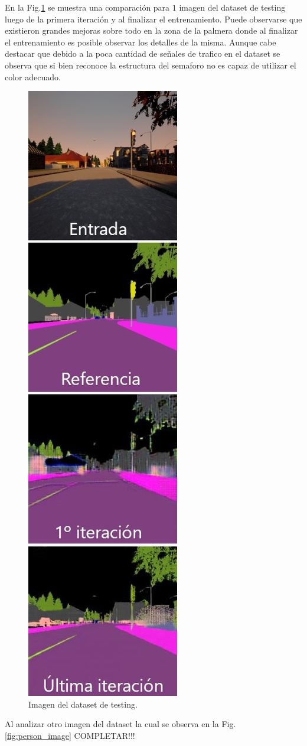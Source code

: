 \documentclass[]{IEEEtran}
\begin{document}
    En la Fig.\ref{fig:results}
    se muestra una comparación para $1$ imagen del dataset de testing luego de la primera iteración 
    y al finalizar el entrenamiento.
    Puede observarse que existieron grandes mejoras sobre todo en la zona de la palmera
    donde al finalizar el entrenamiento es posible observar los detalles de la misma.
    Aunque cabe destacar que debido a la poca cantidad de señales de trafico en el dataset
    se observa que si bien reconoce la estructura del semaforo no es capaz de utilizar el color 
    adecuado.

    \begin{figure}[htb]
        \centering
        \includegraphics[width=.25\textwidth]{Imgs/results.jpeg}    
        \caption{Imagen del dataset de testing.}
        \label{fig:results}
    \end{figure}

    Al analizar otro imagen del dataset la cual se observa en la Fig.\ref{fig:person_image}
    {COMPLETAR!!!}
\end{document}
